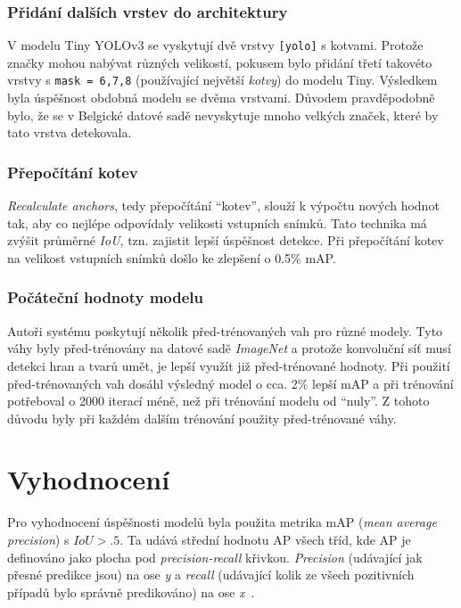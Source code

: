 \documentclass[czech]{ExcelAtFIT} %
\begin{document}
\subsubsection*{Přidání dalších vrstev do architektury}
V modelu Tiny YOLOv3 se vyskytují dvě vrstvy \texttt{[yolo]} s kotvami. Protože značky mohou nabývat různých velikostí, pokusem bylo přidání třetí takovéto vrstvy s \texttt{mask = 6,7,8} (používající největší \emph{kotvy}) do modelu Tiny. Výsledkem byla úspěšnost obdobná modelu se dvěma vrstvami. Důvodem pravděpodobně bylo, že se v Belgické datové sadě nevyskytuje mnoho velkých značek, které by tato vrstva detekovala.

\subsubsection*{Přepočítání kotev}
\emph{Recalculate anchors}, tedy přepočítání ``kotev'', slouží k výpočtu nových hodnot tak, aby co nejlépe odpovídaly velikosti vstupních snímků. Tato technika má zvýšit průměrné \emph{IoU}, tzn. zajistit lepší úspěšnost detekce. Při přepočítání kotev na velikost vstupních snímků došlo ke zlepšení o 0.5\% mAP.

\subsubsection*{Počáteční hodnoty modelu}
Autoři systému poskytují několik před-trénovaných vah pro různé modely. Tyto váhy byly před-trénovány na datové sadě \emph{ImageNet} a protože konvoluční síť musí detekci hran a tvarů umět, je lepší využít již před-trénované hodnoty. Při použití před-trénovaných vah dosáhl výsledný model o cca. 2\% lepší mAP a při trénování potřeboval o 2000 iterací méně, než při trénování modelu od ``nuly''. Z tohoto důvodu byly při každém dalším trénování použity před-trénované váhy.


\section{Vyhodnocení}
\label{vyhodnoceniSekce}
Pro vyhodnocení úspěšnosti modelů byla použita metrika mAP (\emph{mean average precision}) s $IoU > .5$. Ta udává střední hodnotu AP všech tříd, kde AP je definováno jako plocha pod \emph{precision-recall} křivkou. \emph{Precision} (udávající jak přesné predikce jsou) na ose \emph{y} a \emph{recall} (udávající kolik ze všech pozitivních případů bylo správně predikováno) na ose \emph{x}~\cite{mAP}.
\end{document}
